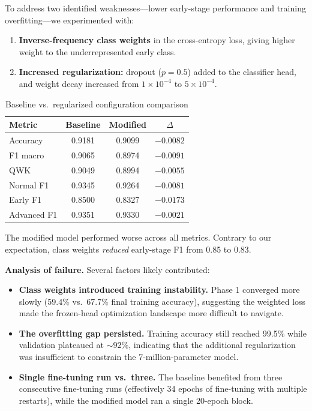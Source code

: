 \documentclass[conference]{IEEEtran}
\begin{document}
To address two identified weaknesses---lower early-stage performance and training overfitting---we experimented with:

\begin{enumerate}
    \item \textbf{Inverse-frequency class weights} in the cross-entropy loss, giving higher weight to the underrepresented early class.
    \item \textbf{Increased regularization:} dropout ($p = 0.5$) added to the classifier head, and weight decay increased from $1 \times 10^{-4}$ to $5 \times 10^{-4}$.
\end{enumerate}

\begin{table}[H]
\centering
\caption{Baseline vs.\ regularized configuration comparison}
\label{tab:comparison}
\begin{tabular}{lccc}
\toprule
\textbf{Metric} & \textbf{Baseline} & \textbf{Modified} & \textbf{$\Delta$} \\
\midrule
Accuracy     & 0.9181 & 0.9099 & $-0.0082$ \\
F1 macro     & 0.9065 & 0.8974 & $-0.0091$ \\
QWK          & 0.9049 & 0.8994 & $-0.0055$ \\
\midrule
Normal F1    & 0.9345 & 0.9264 & $-0.0081$ \\
Early F1     & 0.8500 & 0.8327 & $-0.0173$ \\
Advanced F1  & 0.9351 & 0.9330 & $-0.0021$ \\
\bottomrule
\end{tabular}
\end{table}

The modified model performed worse across all metrics.
Contrary to our expectation, class weights \textit{reduced} early-stage F1 from 0.85 to 0.83.

\textbf{Analysis of failure.} Several factors likely contributed:

\begin{itemize}
    \item \textbf{Class weights introduced training instability.} Phase 1 converged more slowly (59.4\% vs.\ 67.7\% final training accuracy), suggesting the weighted loss made the frozen-head optimization landscape more difficult to navigate.
    \item \textbf{The overfitting gap persisted.} Training accuracy still reached 99.5\% while validation plateaued at $\sim$92\%, indicating that the additional regularization was insufficient to constrain the 7-million-parameter model.
    \item \textbf{Single fine-tuning run vs.\ three.} The baseline benefited from three consecutive fine-tuning runs (effectively 34 epochs of fine-tuning with multiple restarts), while the modified model ran a single 20-epoch block.
\end{itemize}
\end{document}
